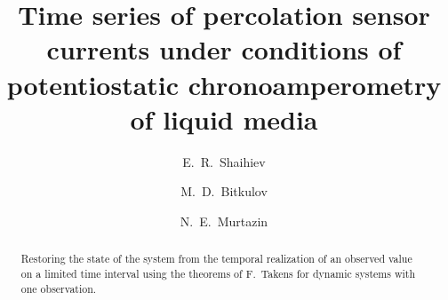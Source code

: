 \begin{englishtitle} %
\title{Time series of percolation sensor currents under conditions of potentiostatic chronoamperometry of liquid media}
\author{E.~R.~Shaihiev  \and  M.~D.~Bitkulov  \and  N.~E.~Murtazin
}

\maketitle

\begin{abstract}
Restoring the state of the system from the temporal realization of an observed value on a limited time interval using the theorems of F.~Takens for dynamic systems with one observation.

\end{abstract}
\end{englishtitle}

\iffalse
%
%





\documentclass[12pt]{llncs}  

\usepackage{iftex}

\ifPDFTeX
\usepackage[T2A]{fontenc}
\usepackage[utf8]{inputenc} %
\usepackage[english,russian]{babel}
\fi



